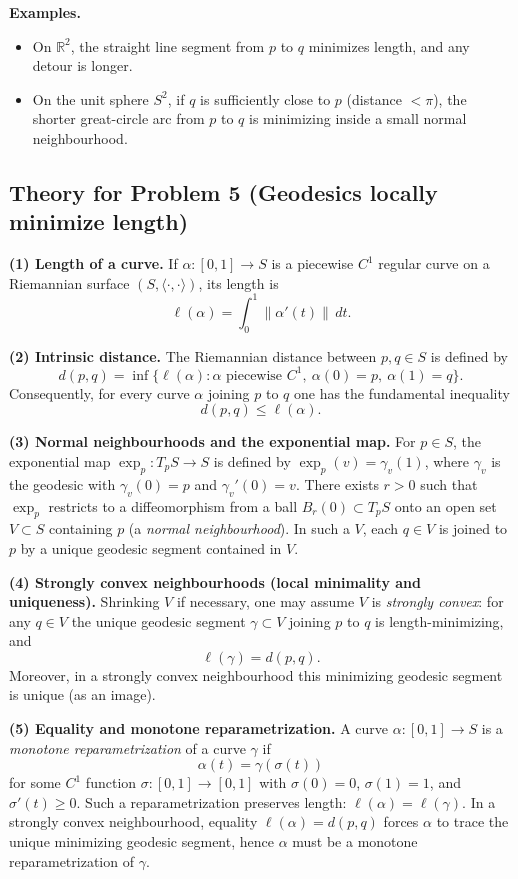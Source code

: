 \documentclass[12pt,a4paper]{article}
\theoremstyle{plain}
\theoremstyle{definition}      %
\begin{document}
\medskip
\textbf{Examples.}
\begin{itemize}
	\item On $\mathbb{R}^2$, the straight line segment from $p$ to $q$ minimizes length, and any detour is longer.
	\item On the unit sphere $S^2$, if $q$ is sufficiently close to $p$ (distance $<\pi$), the shorter great-circle arc
	from $p$ to $q$ is minimizing inside a small normal neighbourhood.
\end{itemize}

\subsection*{Theory for Problem 5 (Geodesics locally minimize length)}

\textbf{(1) Length of a curve.}
If $\alpha:[0,1]\to S$ is a piecewise $C^1$ regular curve on a Riemannian surface $(S,\langle\cdot,\cdot\rangle)$,
its length is
\[
\ell(\alpha)=\int_0^1 \|\alpha'(t)\|\,dt.
\]

\medskip
\textbf{(2) Intrinsic distance.}
The Riemannian distance between $p,q\in S$ is defined by
\[
d(p,q)=\inf\{\ell(\alpha): \alpha \text{ piecewise }C^1,\ \alpha(0)=p,\ \alpha(1)=q\}.
\]
Consequently, for every curve $\alpha$ joining $p$ to $q$ one has the fundamental inequality
\[
d(p,q)\le \ell(\alpha).
\]

\medskip
\textbf{(3) Normal neighbourhoods and the exponential map.}
For $p\in S$, the exponential map $\exp_p:T_pS\to S$ is defined by
$\exp_p(v)=\gamma_v(1)$, where $\gamma_v$ is the geodesic with $\gamma_v(0)=p$ and $\gamma_v'(0)=v$.
There exists $r>0$ such that $\exp_p$ restricts to a diffeomorphism from a ball $B_r(0)\subset T_pS$
onto an open set $V\subset S$ containing $p$ (a \emph{normal neighbourhood}).
In such a $V$, each $q\in V$ is joined to $p$ by a unique geodesic segment contained in $V$.

\medskip
\textbf{(4) Strongly convex neighbourhoods (local minimality and uniqueness).}
Shrinking $V$ if necessary, one may assume $V$ is \emph{strongly convex}:
for any $q\in V$ the unique geodesic segment $\gamma\subset V$ joining $p$ to $q$ is length-minimizing, and
\[
\ell(\gamma)=d(p,q).
\]
Moreover, in a strongly convex neighbourhood this minimizing geodesic segment is unique (as an image).

\medskip
\textbf{(5) Equality and monotone reparametrization.}
A curve $\alpha:[0,1]\to S$ is a \emph{monotone reparametrization} of a curve $\gamma$ if
\[
\alpha(t)=\gamma(\sigma(t))
\]
for some $C^1$ function $\sigma:[0,1]\to[0,1]$ with $\sigma(0)=0$, $\sigma(1)=1$, and $\sigma'(t)\ge 0$.
Such a reparametrization preserves length: $\ell(\alpha)=\ell(\gamma)$.
In a strongly convex neighbourhood, equality $\ell(\alpha)=d(p,q)$ forces $\alpha$ to trace the unique minimizing
geodesic segment, hence $\alpha$ must be a monotone reparametrization of $\gamma$.
\end{document}
